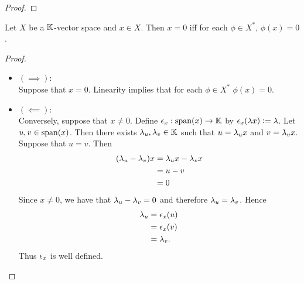 \documentclass{book}
\begin{document}
 \begin{ex}
 \end{ex}
 
 \begin{proof}
 	
 \end{proof}
 
 \begin{ex}
 	
 \end{ex}
 
 
 \begin{ex}
 	Let $X$ be a $\mathbb{K}$-vector space and $x \in X$. Then $x = 0$ iff for each $\phi \in X^*$, $\phi(x) = 0$. 
 \end{ex}
 
 \begin{proof}\
 	\begin{itemize}
 		\item $(\implies)$: \\
 		Suppose that $x = 0$. Linearity implies that for each $\phi \in X^*$ $\phi(x) = 0$. 
 		\item $(\impliedby)$: \\
 		Conversely, suppose that $x \neq 0$. Define $\epsilon_x: \operatorname{span}(x) \rightarrow \mathbb{K}$ by $\epsilon_x(\lambda x) \vcentcolon= \lambda$. Let $u,v \in \operatorname{span}(x)$. Then there exists $\lambda_u, \lambda_v \in \mathbb{K}$ such that $u = \lambda_u x$ and $v = \lambda_v x$. Suppose that $u = v$. Then 
 		\begin{align*}
 			(\lambda_u - \lambda_v)x
 			& = \lambda_u x - \lambda_v x \\
 			& = u - v \\
 			& = 0
 		\end{align*}
 		Since $x \neq 0$, we have that $\lambda_u - \lambda_v = 0$ and therefore $\lambda_u = \lambda_v$. Hence  
 		\begin{align*}
 			\lambda_u 
 			& = \epsilon_x(u) \\
 			& = \epsilon_x(v) \\
 			& = \lambda_v.
 		\end{align*}
 		Thus $\epsilon_x$ is well defined. 
 	\end{itemize}
 \end{proof}
 
 
 
 
 
 
 
 
 
 
 
 
 
 
 
\end{document}
